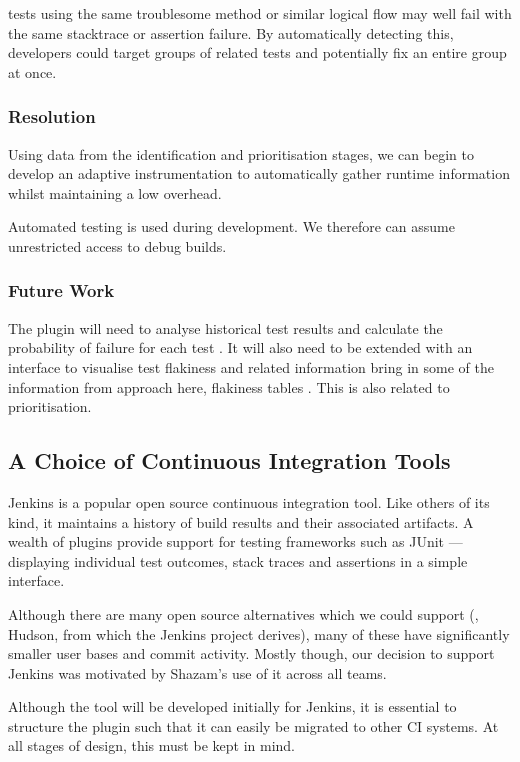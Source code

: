 \flaky{} tests using the same troublesome method or similar logical flow may well fail with the same stacktrace or assertion failure. By automatically detecting this, developers could target groups of related tests and potentially fix an entire group at once.


\subsubsection{Resolution}

Using data from the identification and prioritisation stages, we can begin to develop an adaptive instrumentation to automatically gather runtime information whilst maintaining a low overhead.


Automated testing is used during development. We therefore can assume unrestricted access to debug builds.

\subsubsection{Future Work}

The plugin will need to analyse historical test results and calculate the probability of failure for each test . It will also need to be extended with an interface to visualise test flakiness and related information {\todo bring in some of the information from approach here, flakiness tables \etc}. This is also related to prioritisation.


\subsection{A Choice of Continuous Integration Tools}

Jenkins \cite{Jenkins} is a popular open source continuous integration tool. Like others of its kind, it maintains a history of build results and their associated artifacts. A wealth of plugins provide support for testing frameworks such as JUnit --- displaying individual test outcomes, stack traces and assertions in a simple interface.

Although there are many open source alternatives which we could support (\eg, Hudson, from which the Jenkins project derives), many of these have significantly smaller user bases and commit activity. Mostly though, our decision to support Jenkins was motivated by Shazam's use of it across all teams.

Although the tool will be developed initially for Jenkins, it is essential to structure the plugin such that it can easily be migrated to other CI systems. At all stages of design, this must be kept in mind.